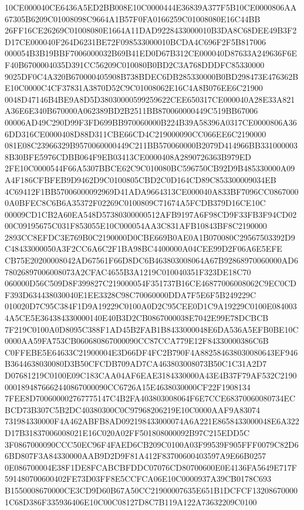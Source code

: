 \documentclass[UTF8,fontset=fandol,zihao=-4,a4paper]{ctexart}
\begin{document}
{{10CE000040CE6436A5ED2BB008E10C0000444E36839A377F5B10CE0000806AA67305B6209C01008098C9664A1B57F0FA0166259C01008080E16C44BB
26FF16CE26269C01008080E1664A11DAD9228433000010B3DA8C68DEE49B3F2D17CE000040F264D6231BE72F098533000010BCDA4C696F2F5B817006
000054B3B19BBF7006000032B69B41ED0D67B312CE000040D87633A249636F6EF40B6700004035D391CC56209C010080B0BD2C3A768DDDFC85330000
9025DF0C4A320B670000405908B738BDEC6DB285330000B0BD298473E476362BE10C0000C4CF37831A3870D52C9C01008062E16C4A8B076EE6C21900
0048D47146B4BE9A8D5D38030000599259622CEE650317CE000040A28E33A821A36E6E340B670000A062389BD2B2511BB870060000449C519BB67006
00006AD49C290D99F3FD699BB970060000B224B39A58396A0317CE0000806A366DD316CE0000408D88D311CBE66CD4C219000090CC066EE6C2190000
081E08C23966329B9570060000449C211BB570060000B2079D414966BB3310000038B30BFE5976CDBB064F9EB03413CE0000408A2890726363B979ED
2FE10C0000544F66A5307BBCE62C9C010080BC596750CB92D9B485330000A09A4F186CFBFEB9D9462D9C0100805CBD2C0D164CD89C853300009034EB
4C69412F1BB57006000092969D41ADA9664313CE000040A833BF7096CC08670000A0BFEC8C6B6A35372F02269C0100809C71674A5FCDB379D16CE10C
00009CD1CB2A60EA548D57380300000512AFB9197A6F98CD9F33FB3F94CD0200C09195675C031F853055E10C000054AA3C831AFB10843BF8C2190000
2893CC8EFDC3E769B0C2190000D0CBE669B0AE0A1B070080C29567503392D9C48433000050A3F2CC6A6C2F1BA98BC4400000A04CEE99D2F06A6E5EFE
CB75E20200008042AD67561F66D8DC6B463803008064A67B92868970060000AD678026897006008073A2CFAC4655B3A1219C010040351F323DE18C70
060000D56C509D8F399827C219000054F351737B16CE46877006008062C9EC0CDF393D634438030040E1EE3328C98C70060000DDA7F5E6F5B249229C
010020D7C95C384F1D9A19229C0100A0D2C95CEE0D1C9A19229C0100E0840034A5CE5E364384330000140E40B3D2CB0867000038E7042E99E78DCBCB
7F219C0100A0D8095C388F1AD45B2FAB1B8433000048E6DA536A5EFB0BE10C0000AA59FA753CB060680867000090CC87CCA779E12F84330000386C6B
C0FFEBE5E64633C21900004E3D66DF4FC2B790F4A882584638030080643EF946B3644638030080D3B50CFCDB709AD7CA463803008073B50C1C31A2D7
D07681219C0100E09C183CAA04AF6EAE3184330000A43E4B37F79AF532C21900001894876662440867000090CC6726A15E4638030000CF22F1908134
7FEE8D700600002767775147C4B2FA403803008064F6E7CCE68370060080734ECBCD73B307C5B2DC40380300C0C97968206219E10C0000AAF9A83074
731984330000F4A462ABFB8AD092198433000074A6A221E8658433000048E6A322D17B31837006008021E16C020A02FF501808000092B97C215EDD5C
3F0867000090CCC50EC96F4FAED6CB209C0100A03F99539F905FFF0079C82D66BD807F3A84330000AAB9D2D9F81A412F83700600403597A9E66B0257
0E086700004E38F1DE8FCABCBFDDC07076CD80700600E0E4136FA5649E717F591480700600402FE73D03FF8E5CCFCA06E10C0000937A39CB0178C693
B1550008670000CE3CD9D60B67A50CC21900007635E651B1DCFCF132086700001C68D386F335936406E10C00C08127D8C7B119A122A73632209C0100
}}
\end{document}
